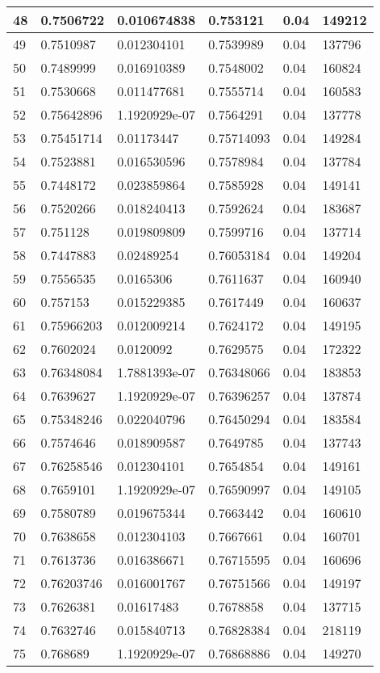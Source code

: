 \begin{longtable}{|l|l|l|l|l|l|}
48 & 0.7506722 & 0.010674838 & 0.753121 & 0.04 & 149212 \\ \hline 
49 & 0.7510987 & 0.012304101 & 0.7539989 & 0.04 & 137796 \\ \hline 
50 & 0.7489999 & 0.016910389 & 0.7548002 & 0.04 & 160824 \\ \hline 
51 & 0.7530668 & 0.011477681 & 0.7555714 & 0.04 & 160583 \\ \hline 
52 & 0.75642896 & 1.1920929e-07 & 0.7564291 & 0.04 & 137778 \\ \hline 
53 & 0.75451714 & 0.01173447 & 0.75714093 & 0.04 & 149284 \\ \hline 
54 & 0.7523881 & 0.016530596 & 0.7578984 & 0.04 & 137784 \\ \hline 
55 & 0.7448172 & 0.023859864 & 0.7585928 & 0.04 & 149141 \\ \hline 
56 & 0.7520266 & 0.018240413 & 0.7592624 & 0.04 & 183687 \\ \hline 
57 & 0.751128 & 0.019809809 & 0.7599716 & 0.04 & 137714 \\ \hline 
58 & 0.7447883 & 0.02489254 & 0.76053184 & 0.04 & 149204 \\ \hline 
59 & 0.7556535 & 0.0165306 & 0.7611637 & 0.04 & 160940 \\ \hline 
60 & 0.757153 & 0.015229385 & 0.7617449 & 0.04 & 160637 \\ \hline 
61 & 0.75966203 & 0.012009214 & 0.7624172 & 0.04 & 149195 \\ \hline 
62 & 0.7602024 & 0.0120092 & 0.7629575 & 0.04 & 172322 \\ \hline 
63 & 0.76348084 & 1.7881393e-07 & 0.76348066 & 0.04 & 183853 \\ \hline 
64 & 0.7639627 & 1.1920929e-07 & 0.76396257 & 0.04 & 137874 \\ \hline 
65 & 0.75348246 & 0.022040796 & 0.76450294 & 0.04 & 183584 \\ \hline 
66 & 0.7574646 & 0.018909587 & 0.7649785 & 0.04 & 137743 \\ \hline 
67 & 0.76258546 & 0.012304101 & 0.7654854 & 0.04 & 149161 \\ \hline 
68 & 0.7659101 & 1.1920929e-07 & 0.76590997 & 0.04 & 149105 \\ \hline 
69 & 0.7580789 & 0.019675344 & 0.7663442 & 0.04 & 160610 \\ \hline 
70 & 0.7638658 & 0.012304103 & 0.7667661 & 0.04 & 160701 \\ \hline 
71 & 0.7613736 & 0.016386671 & 0.76715595 & 0.04 & 160696 \\ \hline 
72 & 0.76203746 & 0.016001767 & 0.76751566 & 0.04 & 149197 \\ \hline 
73 & 0.7626381 & 0.01617483 & 0.7678858 & 0.04 & 137715 \\ \hline 
74 & 0.7632746 & 0.015840713 & 0.76828384 & 0.04 & 218119 \\ \hline 
75 & 0.768689 & 1.1920929e-07 & 0.76868886 & 0.04 & 149270 \\ \hline 
\end{longtable}